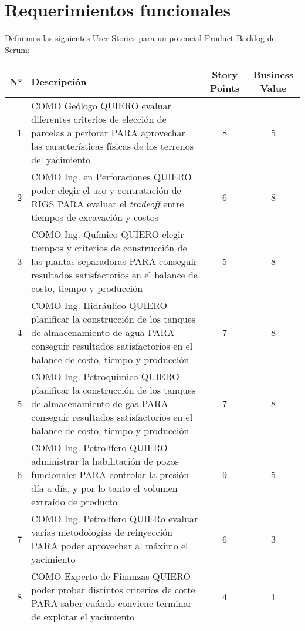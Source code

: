 \section{Requerimientos funcionales}

Definimos las siguientes User Stories para un potencial Product Backlog de Scrum:

\begin{center}
  \begin{tabular}{| r | p{10cm} | c | c | }
    \hline
    N° & Descripción & Story Points & Business Value\\  \hline
    
    1  & COMO Geólogo QUIERO evaluar diferentes criterios de elección de parcelas a perforar PARA aprovechar las características físicas de los terrenos del yacimiento & 8 & 5\\  \hline
    
    2  & COMO Ing. en Perforaciones QUIERO poder elegir el uso y contratación de RIGS PARA evaluar el \textit{tradeoff} entre tiempos de excavación y costos & 6 & 8\\ \hline
    
    3  & COMO Ing. Químico QUIERO elegir tiempos y criterios de construcción de las plantas separadoras PARA conseguir resultados satisfactorios en el balance de costo, tiempo y producción & 5 & 8\\ \hline
    
    4 & COMO Ing. Hidráulico QUIERO planificar la construcción de los tanques de almacenamiento de agua PARA conseguir resultados satisfactorios en el balance de costo, tiempo y producción & 7 & 8\\ \hline
    
    5 & COMO Ing. Petroquímico QUIERO planificar la construcción de los tanques de almacenamiento de gas 
    PARA conseguir resultados satisfactorios en el balance de costo, tiempo y producción & 7 & 8\\ \hline
    
    6 & COMO Ing. Petrolífero QUIERO administrar la habilitación de pozos funcionales PARA controlar 
    la presión día a día, y por lo tanto el volumen extraído de producto & 9 & 5\\ \hline
    
    7 & COMO Ing. Petrolífero QUIERo evaluar varias metodologías de reinyección PARA poder aprovechar 
    al máximo el yacimiento & 6 & 3\\ \hline
    
    8 & COMO Experto de Finanzas QUIERO poder probar distintos criterios de corte PARA saber 
    cuándo conviene terminar de explotar el yacimiento & 4 & 1\\ \hline
    

\end{tabular}
\end{center}
